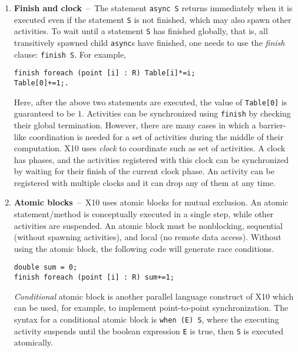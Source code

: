 \begin{enumerate}
\item{\bf Finish and clock}~--~The statement {\tt async S} returns immediately when it is executed even if the statement {\tt S} is not finished, which may also spawn other activities. To wait until a statement {\tt S} has finished globally, that is, all transitively spawned child {\tt async}s have finished, one needs to use the {\it finish} clause: {\tt finish S}. For example, 
\begin{center}
{\small
\begin{verbatim}
finish foreach (point [i] : R) Table[i]*=i;
Table[0]+=1;.
\end{verbatim}
}
\end{center}
Here, after the above two statements are executed, the value of {\tt Table[0]} is guaranteed to be $1$. Activities can be synchronized using {\tt finish} by checking their global termination. However, there are many cases in which a barrier-like coordination is needed for a set of activities during the middle of their computation. X10 uses {\em clock} to coordinate such as set of activities. A clock has phases, and the activities registered with this clock can be synchronized by waiting for their finish of the current clock phase. An activity can be registered with multiple clocks and it can drop any of them at any time.
\item{\bf Atomic blocks}~--~X10 uses atomic blocks for mutual exclusion. An atomic statement/method is conceptually executed in a single step, while other activities are suspended. An atomic block must be nonblocking, sequential (without spawning activities), and local (no remote data access). Without using the atomic block, the following code will generate race conditions.
\begin{center}
{\small
\begin{verbatim}
double sum = 0;
finish foreach (point [i] : R) sum+=1;
\end{verbatim}
}
\end{center}
{\em Conditional} atomic block is another parallel language construct of X10 which can be used, for example, to implement point-to-point synchronization. The syntax for a conditional atomic block is {\tt when (E) S}, where the executing activity suspends until the boolean expression {\tt E} is true, then {\tt S} is executed atomically. 
\end{enumerate}

